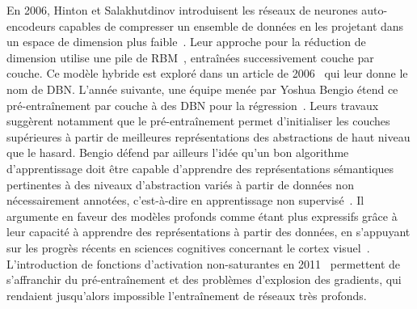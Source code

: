 En 2006, Hinton et Salakhutdinov introduisent les réseaux de neurones auto-encodeurs capables de compresser un ensemble de données en les projetant dans un espace de dimension plus faible~\cite{hinton_reducing_2006}. Leur approche pour la réduction de dimension utilise une pile de \gls{RBM}~\cite{ackley_learning_1985,salakhutdinov_deep_2009}, entraînées successivement couche par couche. Ce modèle hybride est exploré dans un article de 2006~\cite{hinton_fast_2006} qui leur donne le nom de \gls{DBN}. L'année suivante, une équipe menée par Yoshua Bengio étend ce pré-entraînement par couche à des \gls{DBN} pour la régression~\cite{bengio_greedy_2007}. Leurs travaux suggèrent notamment que le pré-entraînement permet d'initialiser les couches supérieures à partir de meilleures représentations des abstractions de haut niveau que le hasard. Bengio défend par ailleurs l'idée qu'un bon algorithme d'apprentissage doit être capable d'apprendre des représentations sémantiques pertinentes à des niveaux d'abstraction variés à partir de données non nécessairement annotées, c'est-à-dire en apprentissage non supervisé~\cite{bengio_learning_2009}. Il argumente en faveur des modèles profonds comme étant plus expressifs grâce à leur capacité à apprendre des représentations à partir des données, en s'appuyant sur les progrès récents en sciences cognitives concernant le cortex visuel~\cite{serre_quantitative_2007}. L'introduction de fonctions d'activation non-saturantes en 2011~\cite{glorot_deep_2011} permettent de s'affranchir du pré-entraînement et des problèmes d'explosion des gradients, qui rendaient jusqu'alors impossible l'entraînement de réseaux très profonds.

